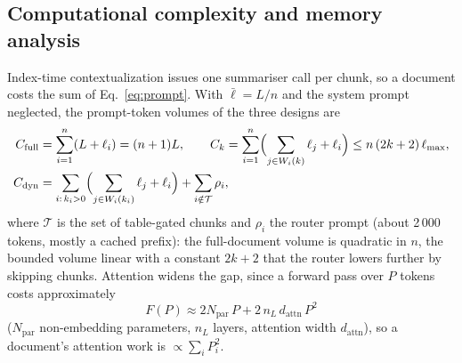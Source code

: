 \documentclass[pdflatex,sn-mathphys-num]{sn-jnl}
\newif\ifprovenance
\newcommand{\verify}[1]{\ifprovenance\textcolor{red}{{\footnotesize [VERIFY: #1]}}\fi}
\theoremstyle{thmstyleone}%
\theoremstyle{thmstylethree}%
\begin{document}
\begin{table}[htbp]
\ifprovenance\footnotetext{\verify{CPU, GPU, RAM, OS, Python and CodeCarbon versions: columns \texttt{cpu\_model}, \texttt{gpu\_model}, \texttt{ram\_total\_size}, \texttt{os}, \texttt{python\_version}, \texttt{codecarbon\_version} of \texttt{RnD/emissions\_data/emissions.csv} (rows written by CodeCarbon 3.3.1 are shifted by two columns from \texttt{region} onward relative to the 3.2.3 header; read those rows by position). Library versions: \texttt{RnD/requirements.txt}. Context windows: the two Modelfiles in \texttt{RnD/Models/}. Peak memory: \texttt{README.md} line~59. Runner footprint and cache sizes: \texttt{RnD/verification/ollama\_runner\_vram.json} and the \texttt{llama\_kv\_cache} log lines in \texttt{ollama\_offload\_pressure\_v0.35.1\_ballast0.json}; model constants from the same server log (5 global and 29 SWA layers, \texttt{n\_embd\_head\_k} 256, 4 KV heads) and the Gemma~3 report. Server versions: \texttt{/var/log/pacman.log} (ollama 0.17.5 from 2026-03-02, 0.32.1 from 2026-07-18, 0.34.0 from 2026-09-11, 0.34.3 from 2026-09-24, 0.35.1 from 2026-10-03).}}\fi
\end{table}

\subsection{Computational complexity and memory analysis}\label{sec:complexity}

Index-time contextualization issues one summariser call per chunk, so a document costs the sum of Eq.~\eqref{eq:prompt}. With $\bar\ell=L/n$ and the system prompt neglected, the prompt-token volumes of the three designs are
\begin{align}
C_{\mathrm{full}}&=\sum_{i=1}^{n}(L+\ell_i)=(n+1)L,\qquad
C_{k}=\sum_{i=1}^{n}\Bigl(\sum_{j\in W_i(k)}\ell_j+\ell_i\Bigr)\le n\,(2k+2)\,\ell_{\max},\nonumber\\
C_{\mathrm{dyn}}&=\sum_{i:\,k_i>0}\Bigl(\sum_{j\in W_i(k_i)}\ell_j+\ell_i\Bigr)+\sum_{i\notin\mathcal T}\rho_i,\label{eq:volume}
\end{align}
where $\mathcal T$ is the set of table-gated chunks and $\rho_i$ the router prompt (about 2\,000 tokens, mostly a cached prefix)\verify{router prompt length: mean 2\,062 tokens printed by \texttt{RnD/ollama\_dynamic\_slice\_length.ipynb}}: the full-document volume is quadratic in $n$, the bounded volume linear with a constant $2k+2$ that the router lowers further by skipping chunks. Attention widens the gap, since a forward pass over $P$ tokens costs approximately \cite{kaplan2020scaling}
\begin{equation}\label{eq:flops}
F(P)\approx 2N_{\mathrm{par}}\,P+2\,n_L\,d_{\mathrm{attn}}\,P^{2}
\end{equation}
($N_{\mathrm{par}}$ non-embedding parameters, $n_L$ layers, attention width $d_{\mathrm{attn}}$), so a document's attention work is $\propto\sum_i P_i^2$.
\end{document}
